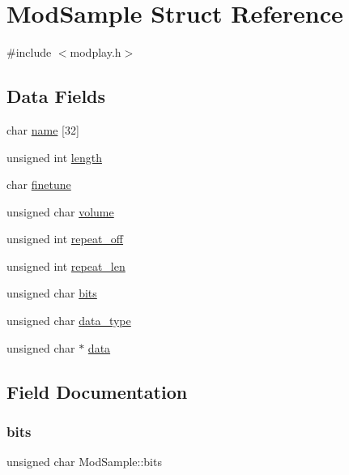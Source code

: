 \hypertarget{structModSample}{}\section{Mod\+Sample Struct Reference}
\label{structModSample}


{\ttfamily \#include $<$modplay.\+h$>$}

\subsection*{Data Fields}
\begin{DoxyCompactItemize}
\item 
char \hyperlink{structModSample_ac557c5bab221399a0976b6f32e92303e}{name} \mbox{[}32\mbox{]}
\item 
unsigned int \hyperlink{structModSample_a429b774753d1da7e00600b42b6837430}{length}
\item 
char \hyperlink{structModSample_a079ed1256b8178f1ad66da5e614b3c0d}{finetune}
\item 
unsigned char \hyperlink{structModSample_a4162e3c9eb5e2a13fd90f871fc2d950e}{volume}
\item 
unsigned int \hyperlink{structModSample_aa2222ff52c86152fc631171db9113290}{repeat\+\_\+off}
\item 
unsigned int \hyperlink{structModSample_a1426ae72bf07dacde5539181b18ea001}{repeat\+\_\+len}
\item 
unsigned char \hyperlink{structModSample_a990cb7f8494ef1b606cd8e70655f8c6d}{bits}
\item 
unsigned char \hyperlink{structModSample_a1f3a47637cbfdd492f7af32c4226c9d3}{data\+\_\+type}
\item 
unsigned char $\ast$ \hyperlink{structModSample_a541eeaaeb296d97b69f9cc00d9cb3d3b}{data}
\end{DoxyCompactItemize}


\subsection{Field Documentation}
\mbox{\label{structModSample_a990cb7f8494ef1b606cd8e70655f8c6d}} 
\subsubsection{\texorpdfstring{bits}{bits}}
{\footnotesize\ttfamily unsigned char Mod\+Sample\+::bits}

